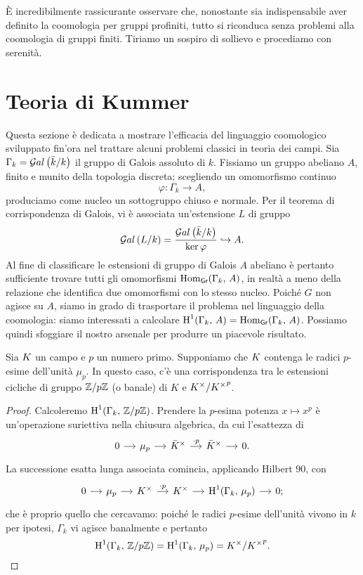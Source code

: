 \begin{Profinite}
	È incredibilmente rassicurante osservare che, nonostante sia indispensabile aver definito la coomologia per gruppi profiniti, tutto si riconduca senza problemi alla coomologia di gruppi finiti. Tiriamo un sospiro di sollievo e procediamo con serenità.
\end{Profinite}

\section{Teoria di Kummer}
Questa sezione è dedicata a mostrare l'efficacia del linguaggio coomologico sviluppato fin'ora nel trattare alcuni problemi classici in teoria dei campi.
Sia $ \Gamma_k = \mathcal{G}al\left( \bar{k}/ k \right) $ il gruppo di Galois assoluto di $ k $. Fissiamo un gruppo abeliano $ A $, finito e munito della topologia discreta; scegliendo un omomorfismo continuo
\[ \varphi \colon \Gamma_k \to A, \]
produciamo come nucleo un sottogruppo chiuso e normale. Per il teorema di corrispondenza di Galois, vi è associata un'estensione $ L $ di gruppo
\[ \mathcal{G}al\left( L/k \right) = \frac{\mathcal{G}al\left( \bar{k}/ k \right)}{\ker \varphi} \hookrightarrow A. \]
Al fine di classificare le estensioni di gruppo di Galois $ A $ abeliano è pertanto sufficiente trovare tutti gli omomorfismi $ \operatorname{Hom}_{\textsf{Gr}}(\Gamma_k, \, A) $, in realtà a meno della relazione che identifica due omomorfismi con lo stesso nucleo. Poiché $ G $ non agisce su $ A $, siamo in grado di trasportare il problema nel linguaggio della coomologia: siamo interessati a calcolare $ \operatorname{H}^1(\Gamma_k, \, A) = \operatorname{Hom}_{\textsf{Gr}}(\Gamma_k, \, A) $. Possiamo quindi sfoggiare il nostro arsenale per produrre un piacevole risultato.

\begin{theorem}[di Kummer]
	Sia $ K $ un campo e $ p $ un numero primo. Supponiamo che $ K $ contenga le radici $ p $-esime dell'unità $ \mu_p $. In questo caso, c'è una corrispondenza tra le estensioni cicliche di gruppo $ \mathbb{Z}/p\mathbb{Z} $ (o banale) di $ K $ e $ K^\times / {K^\times}^p $.
\end{theorem}
\begin{proof}
	Calcoleremo $ \operatorname{H}^1(\Gamma_k, \, \mathbb{Z}/p\mathbb{Z}) $. Prendere la $ p $-esima potenza $ x \mapsto x^p $ è un'operazione suriettiva nella chiusura algebrica, da cui l'esattezza di
	\[\begin{tikzcd}[column sep = small]
	0 \rar
	& \mu_p \rar
	& \bar{\K}^\times \rar["\cdot p"]
	& \bar{\K}^\times \rar
	& 0.
	\end{tikzcd}  \]
	La successione esatta lunga associata comincia, applicando Hilbert 90, con
	\[\begin{tikzcd}[column sep = small]
	0 \rar
	& \mu_p \rar
	& \K^\times \rar["\cdot p"]
	& \K^\times \rar
	& \HH^1(\Gamma_k, \, \mu_p) \rar
	& 0;
	\end{tikzcd}  \]
	che è proprio quello che cercavamo: poiché le radici $ p $-esime dell'unità vivono in $ k $ per ipotesi, $ \Gamma_k $ vi agisce banalmente e pertanto
	\[ \operatorname{H}^1(\Gamma_k, \, \mathbb{Z}/p\mathbb{Z}) = \operatorname{H}^1(\Gamma_k, \, \mu_p) =K^\times / {K^\times}^p . \qedhere \]
\end{proof}

